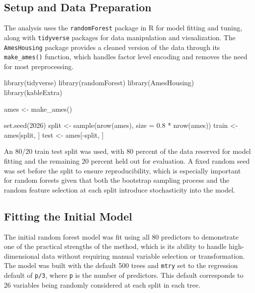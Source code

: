 \documentclass[
  11pt,
  letterpaper,
]{article}
\newenvironment{Shaded}{\begin{snugshade}}{\end{snugshade}}
\newcommand{\AttributeTok}[1]{\textcolor[rgb]{0.40,0.45,0.13}{#1}}
\newcommand{\DecValTok}[1]{\textcolor[rgb]{0.68,0.00,0.00}{#1}}
\newcommand{\FloatTok}[1]{\textcolor[rgb]{0.68,0.00,0.00}{#1}}
\newcommand{\FunctionTok}[1]{\textcolor[rgb]{0.28,0.35,0.67}{#1}}
\newcommand{\NormalTok}[1]{\textcolor[rgb]{0.00,0.23,0.31}{#1}}
\newcommand{\OtherTok}[1]{\textcolor[rgb]{0.00,0.23,0.31}{#1}}
\newcommand{\SpecialCharTok}[1]{\textcolor[rgb]{0.37,0.37,0.37}{#1}}
\begin{document}
\subsection{Setup and Data
Preparation}\label{setup-and-data-preparation}

The analysis uses the \texttt{randomForest} package in R for model
fitting and tuning, along with \texttt{tidyverse} packages for data
manipulation and visualization. The \texttt{AmesHousing} package
provides a cleaned version of the data through its \texttt{make\_ames()}
function, which handles factor level encoding and removes the need for
most preprocessing.

\begin{Shaded}
\begin{Highlighting}[]
\FunctionTok{library}\NormalTok{(tidyverse)}
\FunctionTok{library}\NormalTok{(randomForest)}
\FunctionTok{library}\NormalTok{(AmesHousing)}
\FunctionTok{library}\NormalTok{(kableExtra)}

\NormalTok{ames }\OtherTok{\textless{}{-}} \FunctionTok{make\_ames}\NormalTok{()}

\FunctionTok{set.seed}\NormalTok{(}\DecValTok{2026}\NormalTok{)}
\NormalTok{split }\OtherTok{\textless{}{-}} \FunctionTok{sample}\NormalTok{(}\FunctionTok{nrow}\NormalTok{(ames), }\AttributeTok{size =} \FloatTok{0.8} \SpecialCharTok{*} \FunctionTok{nrow}\NormalTok{(ames))}
\NormalTok{train }\OtherTok{\textless{}{-}}\NormalTok{ ames[split, ]}
\NormalTok{test }\OtherTok{\textless{}{-}}\NormalTok{ ames[}\SpecialCharTok{{-}}\NormalTok{split, ]}
\end{Highlighting}
\end{Shaded}

An 80/20 train test split was used, with 80 percent of the data reserved
for model fitting and the remaining 20 percent held out for evaluation.
A fixed random seed was set before the split to ensure reproducibility,
which is especially important for random forests given that both the
bootstrap sampling process and the random feature selection at each
split introduce stochasticity into the model.

\subsection{Fitting the Initial Model}\label{fitting-the-initial-model}

The initial random forest model was fit using all 80 predictors to
demonstrate one of the practical strengths of the method, which is its
ability to handle high-dimensional data without requiring manual
variable selection or transformation. The model was built with the
default 500 trees and \texttt{mtry} set to the regression default of
\texttt{p/3}, where \texttt{p} is the number of predictors. This default
corresponds to 26 variables being randomly considered at each split in
each tree.
\end{document}
